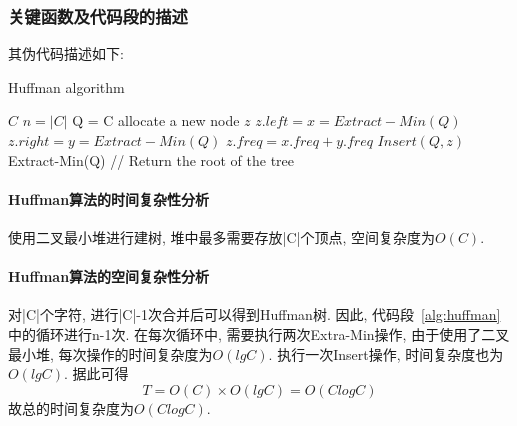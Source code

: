 \subsubsection{关键函数及代码段的描述}
其伪代码描述如下:
\begin{algorithm}
	\caption{Huffman algorithm}\label{alg:huffman}
	\begin{algorithmic}{1}
		\Require $C$
		\State $n = |C|$
		\State Q = C
		allocate a new node $\mathit{z}$
		\State $\mathit{z}.left = x = Extract-Min(Q)$
		\State $\mathit{z}.right = y = Extract-Min(Q)$
		\State $\mathit{z}.freq = x.freq + y.freq$
		\State $Insert(Q, \mathit{z})$
		\EndFor
		\Return Extract-Min(Q) // Return the root of the tree
	\end{algorithmic}
\end{algorithm}

\paragraph{Huffman算法的时间复杂性分析}
使用二叉最小堆进行建树, 堆中最多需要存放|C|个顶点, 空间复杂度为$O(C)$.

\paragraph{Huffman算法的空间复杂性分析}
对|C|个字符, 进行|C|-1次合并后可以得到Huffman树. 因此,
代码段~\ref{alg:huffman}中的循环进行n-1次. 在每次循环中,
需要执行两次Extra-Min操作, 由于使用了二叉最小堆, 每次操作的时间复杂度为$O(lgC)$.
执行一次Insert操作, 时间复杂度也为$O(lgC)$. 据此可得
\begin{equation}
	T = O(C) \times O(lgC) = O(ClogC)
	\label{eq:huffmanTimeComplexity}
\end{equation}
故总的时间复杂度为$O(ClogC)$.
